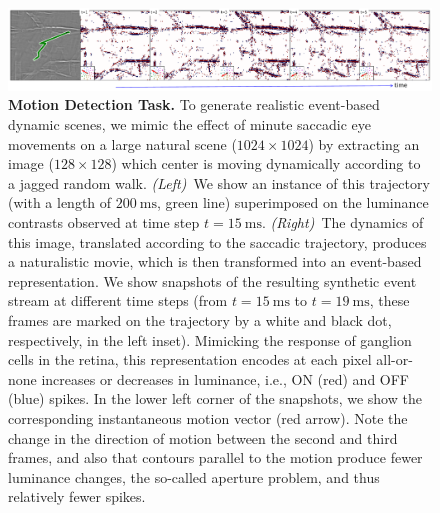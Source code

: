 \documentclass[default]{sn-jnl}%
\theoremstyle{thmstyleone}%
\theoremstyle{thmstyletwo}%
\theoremstyle{thmstylethree}%
\newcommand{\ms}{\si{\milli\second}}%
\begin{document}
\begin{figure}%
    \centering
    \includegraphics[width=0.95\linewidth]{figures/motion_task.pdf}
    \caption{
        {\bf Motion Detection Task.} To generate realistic event-based dynamic scenes, we mimic the effect of minute saccadic eye movements on a large natural scene ($1024\times1024$) by extracting an image ($128\times128$) which center is moving dynamically according to a jagged random walk. \textit{(Left)}~We show an instance of this trajectory (with a length of $200~\ms$, green line) superimposed on the luminance contrasts observed at time step $t=15~\ms$. \textit{(Right)}~The dynamics of this image, translated according to the saccadic trajectory, produces a naturalistic movie, which is then transformed into an event-based representation. We show snapshots of the resulting synthetic event stream at different time steps (from $t=15~\ms$ to $t=19~\ms$, these frames are marked on the trajectory by a white and black dot, respectively, in the left inset). Mimicking the response of ganglion cells in the retina, this representation encodes at each pixel all-or-none increases or decreases in luminance, i.e., ON (red) and OFF (blue) spikes. In the lower left corner of the snapshots, we show the corresponding instantaneous motion vector (red arrow). Note the change in the direction of motion between the second and third frames, and also that contours parallel to the motion produce fewer luminance changes, the so-called aperture problem, and thus relatively fewer spikes.
        }
    \label{fig:motion_task}
\end{figure}
\end{document}
